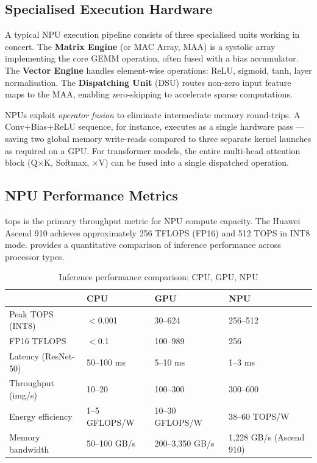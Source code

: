 \subsection{Specialised Execution Hardware}
\label{subsec:npu-hw}

A typical NPU execution pipeline consists of three specialised units
working in concert. The \textbf{Matrix Engine} (or MAC Array, MAA) is a
systolic array implementing the core GEMM operation, often fused with a
bias accumulator. The \textbf{Vector Engine} handles element-wise
operations: ReLU, sigmoid, tanh, layer normalisation. The \textbf{Dispatching
Unit} (DSU) routes non-zero input feature maps to the MAA, enabling
zero-skipping to accelerate sparse computations.

NPUs exploit \textit{operator fusion} to eliminate intermediate memory
round-trips. A Conv+Bias+ReLU sequence, for instance, executes as a single
hardware pass — saving two global memory write-reads compared to three
separate kernel launches as required on a GPU. For transformer models,
the entire multi-head attention block (Q$\times$K, Softmax, $\times$V) can
be fused into a single dispatched operation.


\subsection{NPU Performance Metrics}
\label{subsec:npu-metrics}

\acrfull{tops} is the primary throughput metric for NPU compute capacity.
The Huawei Ascend 910 achieves approximately 256 TFLOPS (FP16) and 512 TOPS
in INT8 mode.  provides a quantitative comparison of
inference performance across processor types.

\begin{table}[htbp]
  \centering
  \caption{Inference performance comparison: CPU, GPU, NPU}
  \label{tab:perf-metrics}
  \begin{tabularx}{\textwidth}{lXXX}
    \toprule
    \tableheader{Metric & CPU & GPU & NPU} \\
    \midrule
    Peak TOPS (INT8) & $<$0.001 & 30–624 & 256–512 \\
    \rowcolor{TableRowOdd}
    FP16 TFLOPS     & $<$0.1   & 100–989 & 256 \\
    Latency (ResNet-50) & 50–100 ms & 5–10 ms & 1–3 ms \\
    \rowcolor{TableRowOdd}
    Throughput (img/s) & 10–20 & 100–300 & 300–600 \\
    Energy efficiency & 1–5 GFLOPS/W & 10–30 GFLOPS/W & 38–60 TOPS/W \\
    \rowcolor{TableRowOdd}
    Memory bandwidth & 50–100 GB/s & 200–3,350 GB/s & 1,228 GB/s (Ascend 910) \\
    \bottomrule
  \end{tabularx}
\end{table}

